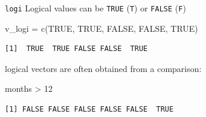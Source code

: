 \documentclass[
  ignorenonframetext,
]{beamer}
\newenvironment{Shaded}{\begin{snugshade}}{\end{snugshade}}
\newcommand{\ConstantTok}[1]{\textcolor[rgb]{0.67,0.33,0.00}{#1}}
\newcommand{\DecValTok}[1]{\textcolor[rgb]{0.69,0.50,0.00}{#1}}
\newcommand{\FunctionTok}[1]{\textcolor[rgb]{0.39,0.29,0.61}{#1}}
\newcommand{\NormalTok}[1]{\textcolor[rgb]{0.12,0.11,0.11}{#1}}
\newcommand{\OtherTok}[1]{\textcolor[rgb]{0.00,0.43,0.16}{#1}}
\newcommand{\SpecialCharTok}[1]{\textcolor[rgb]{0.24,0.68,0.91}{#1}}
\begin{document}
\begin{frame}[fragile]{\texttt{logi}}
\protect\hypertarget{logi}{}
Logical values can be \texttt{TRUE} (\texttt{T}) or \texttt{FALSE}
(\texttt{F})

\begin{Shaded}
\begin{Highlighting}[]
\NormalTok{v\_logi }\OtherTok{=} \FunctionTok{c}\NormalTok{(}\ConstantTok{TRUE}\NormalTok{, }\ConstantTok{TRUE}\NormalTok{, }\ConstantTok{FALSE}\NormalTok{, }\ConstantTok{FALSE}\NormalTok{, }\ConstantTok{TRUE}\NormalTok{)}
\end{Highlighting}
\end{Shaded}

\begin{verbatim}
[1]  TRUE  TRUE FALSE FALSE  TRUE
\end{verbatim}

logical vectors are often obtained from a comparison:

\begin{Shaded}
\begin{Highlighting}[]
\NormalTok{months }\SpecialCharTok{\textgreater{}} \DecValTok{12}
\end{Highlighting}
\end{Shaded}

\begin{verbatim}
[1] FALSE FALSE FALSE FALSE FALSE  TRUE
\end{verbatim}
\end{frame}
\end{document}
